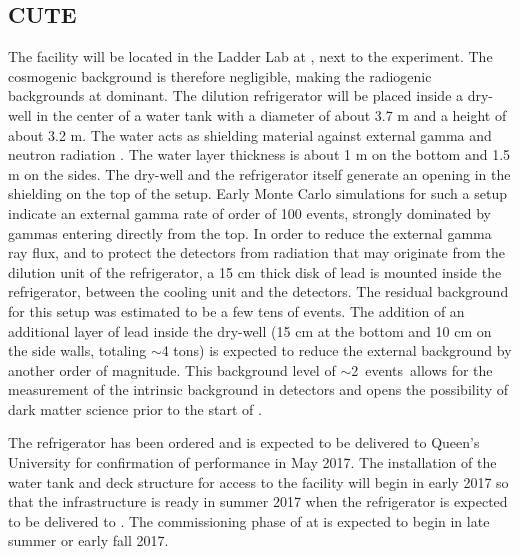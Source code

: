 
\subsection{CUTE}
\label{sec:cute}

The \cute facility will be located in the Ladder Lab at \SNOLAB, next to the \SuperCDMS experiment. The cosmogenic background is therefore negligible, making the radiogenic backgrounds at \cute dominant. The dilution refrigerator will be placed inside a dry-well in the center of a water tank with a diameter of about 3.7 m and a height of about 3.2 m. The water acts as shielding material against external gamma and neutron radiation . The water layer thickness is about 1 m on the bottom and 1.5 m on the sides. The dry-well and the refrigerator itself generate an opening in the shielding on the top of the setup. Early Monte Carlo simulations for such a setup indicate an external gamma rate of order of 100 events\perkkd, strongly dominated by gammas entering directly from the top. In order to reduce the external gamma ray flux, and to protect the detectors from radiation that may originate from the dilution unit of the refrigerator, a 15 cm thick disk of lead is mounted inside the refrigerator, between the cooling unit and the detectors. The residual background for this setup was estimated to be a few tens of events\perkkd. The addition of an additional layer of lead inside the dry-well (15 cm at the bottom and 10 cm on the side walls, totaling $\sim$4 tons) is expected to reduce the external background by another order of magnitude. This background level of $\sim$2~events\perkkd\ allows for the measurement of the intrinsic  background in \scs detectors and opens the possibility of dark matter science prior to the start of \scs.

The \cute refrigerator has been ordered and is expected to be delivered to Queen's University for confirmation of performance in May 2017. The installation of the water tank and deck structure for access to the facility will begin in early 2017 so that the infrastructure is ready in summer 2017 when the refrigerator is expected to be delivered to \SNOLAB. The commissioning phase of \cute at \SNOLAB is expected to begin in late summer or early fall 2017.


